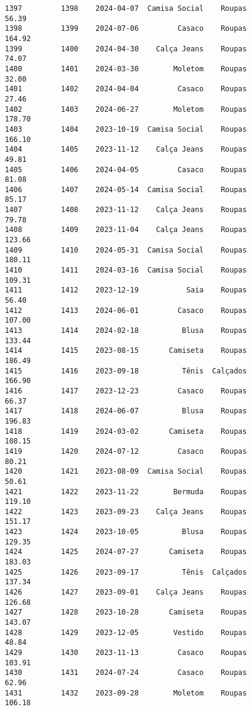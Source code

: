 \documentclass[11pt]{article}
\begin{document}
\begin{Verbatim}[commandchars=\\\{\}]
1397         1398    2024-04-07  Camisa Social    Roupas           56.39   
1398         1399    2024-07-06         Casaco    Roupas          164.92   
1399         1400    2024-04-30    Calça Jeans    Roupas           74.07   
1400         1401    2024-03-30        Moletom    Roupas           32.00   
1401         1402    2024-04-04         Casaco    Roupas           27.46   
1402         1403    2024-06-27        Moletom    Roupas          178.70   
1403         1404    2023-10-19  Camisa Social    Roupas          166.10   
1404         1405    2023-11-12    Calça Jeans    Roupas           49.81   
1405         1406    2024-04-05         Casaco    Roupas           81.08   
1406         1407    2024-05-14  Camisa Social    Roupas           85.17   
1407         1408    2023-11-12    Calça Jeans    Roupas           79.78   
1408         1409    2023-11-04    Calça Jeans    Roupas          123.66   
1409         1410    2024-05-31  Camisa Social    Roupas          180.11   
1410         1411    2024-03-16  Camisa Social    Roupas          109.31   
1411         1412    2023-12-19           Saia    Roupas           56.40   
1412         1413    2024-06-01         Casaco    Roupas          107.00   
1413         1414    2024-02-18          Blusa    Roupas          133.44   
1414         1415    2023-08-15       Camiseta    Roupas          186.49   
1415         1416    2023-09-18          Tênis  Calçados          166.90   
1416         1417    2023-12-23         Casaco    Roupas           66.37   
1417         1418    2024-06-07          Blusa    Roupas          196.83   
1418         1419    2024-03-02       Camiseta    Roupas          108.15   
1419         1420    2024-07-12         Casaco    Roupas           80.21   
1420         1421    2023-08-09  Camisa Social    Roupas           50.61   
1421         1422    2023-11-22        Bermuda    Roupas          119.10   
1422         1423    2023-09-23    Calça Jeans    Roupas          151.17   
1423         1424    2023-10-05          Blusa    Roupas          129.35   
1424         1425    2024-07-27       Camiseta    Roupas          183.03   
1425         1426    2023-09-17          Tênis  Calçados          137.34   
1426         1427    2023-09-01    Calça Jeans    Roupas          126.68   
1427         1428    2023-10-28       Camiseta    Roupas          143.07   
1428         1429    2023-12-05        Vestido    Roupas           48.84   
1429         1430    2023-11-13         Casaco    Roupas          103.91   
1430         1431    2024-07-24         Casaco    Roupas           62.96   
1431         1432    2023-09-28        Moletom    Roupas          106.18   

\end{Verbatim}
\end{document}
